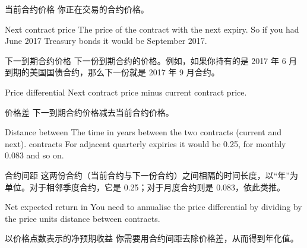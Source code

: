 \begin{chineseblock}当前合约价格 你正在交易的合约价格。\end{chineseblock}

\bipairgap

\begin{englishblock} Next contract price The price of the contract with the next expiry. So if you had June 2017 Treasury bonds it would be September 2017. \end{englishblock}

\begin{chineseblock}下一到期合约价格 下一份到期合约的价格。例如，如果你持有的是 2017 年 6 月到期的美国国债合约，那么下一份就是 2017 年 9 月合约。\end{chineseblock}

\bipairgap

\begin{englishblock} Price differential Next contract price minus current contract price. \end{englishblock}

\begin{chineseblock}价格差 下一到期合约价格减去当前合约价格。\end{chineseblock}

\bipairgap

\begin{englishblock} Distance between The time in years between the two contracts (current and next). contracts For adjacent quarterly expiries it would be 0.25, for monthly 0.083 and so on. \end{englishblock}

\begin{chineseblock}合约间距 这两份合约（当前合约与下一份合约）之间相隔的时间长度，以“年”为单位。对于相邻季度合约，它是 0.25；对于月度合约则是 0.083，依此类推。\end{chineseblock}

\bipairgap

\begin{englishblock} Net expected return in You need to annualise the price differential by dividing by the price units distance between contracts. \end{englishblock}

\begin{chineseblock}以价格点数表示的净预期收益 你需要用合约间距去除价格差，从而得到年化值。\end{chineseblock}

\bipairgap

